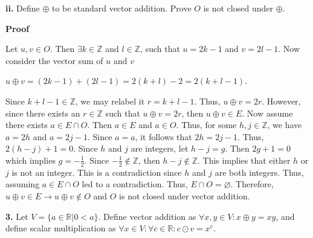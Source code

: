 \documentclass[12pt, a4paper]{article}
\begin{document}
\newpage

\begin{description}

\item\textbf{ii.} Define $\oplus$ to be standard vector addition. Prove $O$ is not closed under $\oplus$.

\vspace{2mm}

\textbf{Proof}\par

Let $u,v\in O$. Then $\exists k\in\mathbb{Z}$ and $l\in\mathbb{Z}$, such that $u=2k-1$ and $v=2l-1$. Now consider the vector sum of $u$ and $v$\par

\vspace{2mm}

\centerline{$u\oplus v=(2k-1)+(2l-1)=2(k+l)-2=2(k+l-1)$.}

\vspace{2mm}

Since $k+l-1\in\mathbb{Z}$, we may relabel it $r=k+l-1$. Thus, $u\oplus v=2r$. However, since there exists an $r\in\mathbb{Z}$ such that $u\oplus v=2r$, then $u\oplus v\in E$. Now assume there exists $a\in E\cap O$. Then $a\in E$ and $a\in O$. Thus, for some $h,j\in\mathbb{Z}$, we have $a=2h$ and $a=2j-1$. Since $a=a$, it follows that $2h=2j-1$. Thus, $2(h-j)+1=0$. Since $h$ and $j$ are integers, let $h-j=g$. Then $2g+1=0$ which implies $g=-\frac{1}{2}$. Since $-\frac{1}{2}\notin\mathbb{Z}$, then $h-j\notin\mathbb{Z}$. This implies that either $h$ or $j$ is not an integer. This is a contradiction since $h$ and $j$ are both integers. Thus, assuming $a\in E\cap O$ led to a contradiction. Thus, $E\cap O=\varnothing$. Therefore, $u\oplus v\in E\rightarrow u\oplus v\notin O$ and $O$ is not closed under vector addition.

\end{description}

\vspace{4mm}

\noindent\textbf{3.} Let $V=\{a\in\mathbb{R}$\hspace{1mm}$|$\hspace{1mm}$ 0<a\}$. Define vector addition as $\forall x,y\in V\colon x\oplus y=xy$, and define scalar multiplication as $\forall x\in V\colon\forall c\in\mathbb{R}\colon c\odot v=x^c$.\par
\end{document}

